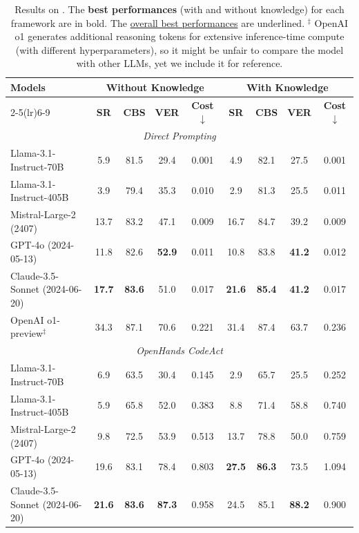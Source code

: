 \begin{table}[t]
\small
\centering
\caption{Results on \bench. The \textbf{best performances} (with and without knowledge) for each framework are in bold. The \underline{overall best performances} are underlined. $^\ddag$ OpenAI o1 generates additional reasoning tokens for extensive inference-time compute (with different hyperparameters), so it might be unfair to compare the model with other LLMs, yet we include it for reference. }
\vspace{-5.5pt}
\begin{tabular}{lcccccccc}
\toprule
\multirow{2.5}{*}{\textbf{Models}} & \multicolumn{4}{c}{\textbf{Without Knowledge}} & \multicolumn{4}{c}{\textbf{With Knowledge}} \\
\cmidrule(lr){2-5}\cmidrule(lr){6-9}
& \textbf{SR} & \textbf{CBS} & \textbf{VER} & \textbf{Cost $\downarrow$} & \textbf{SR} & \textbf{CBS} & \textbf{VER} & \textbf{Cost $\downarrow$} \\
\midrule
\multicolumn{9}{c}{\textit{Direct Prompting}} \\
\midrule
Llama-3.1-Instruct-70B & 5.9 & 81.5 & 29.4 & 0.001 & 4.9 & 82.1 & 27.5 & 0.001 \\
Llama-3.1-Instruct-405B & 3.9 & 79.4 & 35.3 & 0.010 & 2.9 & 81.3 & 25.5 & 0.011 \\
Mistral-Large-2 (2407) & 13.7 & 83.2 & 47.1 & 0.009 & 16.7 & 84.7 & 39.2 & 0.009 \\
\midrule
GPT-4o (2024-05-13) & 11.8 & 82.6 & \textbf{52.9} & 0.011 & 10.8 & 83.8 & \textbf{41.2} & 0.012 \\
Claude-3.5-Sonnet (2024-06-20) & \textbf{17.7} & \textbf{83.6} & 51.0 & 0.017 & \textbf{21.6} & \textbf{85.4} & \textbf{41.2} & 0.017 \\
\rowcolor{mygray}
OpenAI o1-preview$^\ddag$ & 34.3 & 87.1 & 70.6 & 0.221 & 31.4 & 87.4 & 63.7 & 0.236\\ 
\midrule
\multicolumn{9}{c}{\textit{OpenHands CodeAct}} \\
\midrule
Llama-3.1-Instruct-70B & 6.9 & 63.5 & 30.4 & 0.145 & 2.9 & 65.7 & 25.5 & 0.252 \\
Llama-3.1-Instruct-405B & 5.9 & 65.8 & 52.0 & 0.383 & 8.8 & 71.4 & 58.8 & 0.740 \\
Mistral-Large-2 (2407) & 9.8 & 72.5 & 53.9 & 0.513 & 13.7 & 78.8 & 50.0 & 0.759 \\
\midrule
GPT-4o (2024-05-13) & 19.6 & 83.1 & 78.4 & 0.803 & \textbf{27.5} & \textbf{86.3} & 73.5 & 1.094 \\
Claude-3.5-Sonnet (2024-06-20) & \textbf{21.6} & \textbf{83.6} & \textbf{87.3} & 0.958 & 24.5 & 85.1 & \textbf{88.2} & 0.900 \\

\end{tabular}
\end{table}
